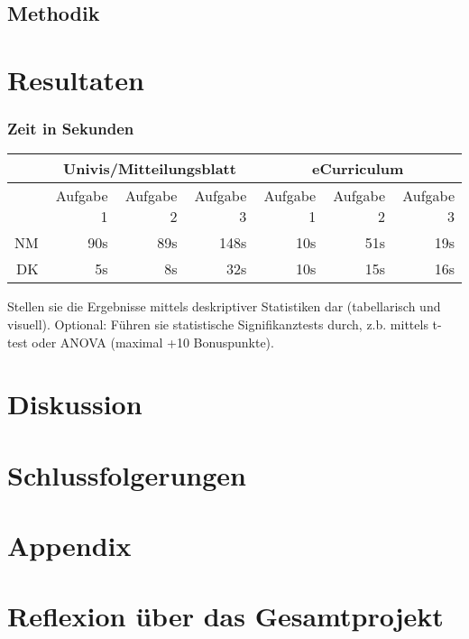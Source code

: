 \documentclass[a4paper,10pt]{scrartcl}
\begin{document}
\subsection{Methodik}



\section{Resultaten} 

\subsubsection*{Zeit in Sekunden} 

\begin{center}
\begin{tabular}{r|r|r|r|r|r|r}
    & \multicolumn{3}{c|}{Univis/Mitteilungsblatt} & \multicolumn{3}{c}{eCurriculum} \\ \hline
    & Aufgabe 1 & Aufgabe 2 & Aufgabe 3 & Aufgabe 1 & Aufgabe 2 & Aufgabe 3  \\ \hline
    NM & 90s & 89s & 148s & 10s & 51s & 19s\\ \hline
    DK & 5s & 8s & 32s & 10s & 15s & 16s\\
\end{tabular}
\end{center}

Stellen sie die Ergebnisse mittels deskriptiver Statistiken dar (tabellarisch und visuell). 
Optional: Führen sie statistische Signifikanztests durch, z.b. mittels t-test oder ANOVA (maximal +10 Bonuspunkte). 

\section{Diskussion}


\section{Schlussfolgerungen}


\section{Appendix}

\section{Reflexion über das Gesamtprojekt}
\end{document}
